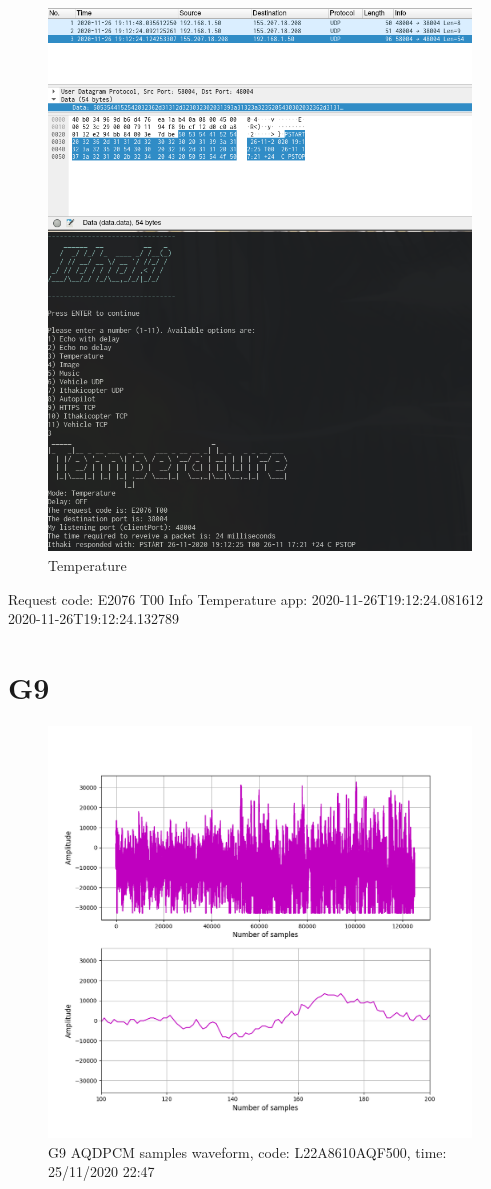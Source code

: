 \documentclass[hidelinks, 12pt, a4paper]{article}
\begin{document}
\begin{figure}[h!]
\centering
	\includegraphics[height=.38\textheight, width=.8\textwidth]{assets/session1/temp.png}
	\caption{Temperature} 
\end{figure}
Request code: E2076 T00
Info Temperature app:
2020-11-26T19:12:24.081612
2020-11-26T19:12:24.132789


\section{G9}

\begin{figure}[h!]
\centering
	\includegraphics[height=.38\textheight, width=\textwidth]{assets/session1/g9_aq.png}
	\caption{G9 AQDPCM samples waveform, code: L22A8610AQF500, time: 25/11/2020 22:47} 
\end{figure}
\end{document}
